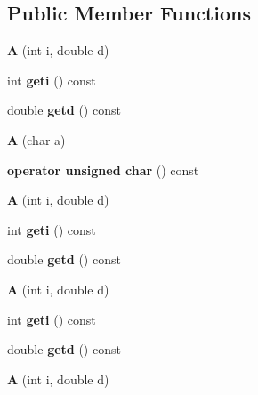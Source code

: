 \subsection*{Public Member Functions}
\begin{DoxyCompactItemize}
\item 
\mbox{\label{struct_a_af41bea0f740b099a40e80facb3f7833e}} 
{\bfseries A} (int i, double d)
\item 
\mbox{\label{struct_a_a706386ebda5915b4439251de29893702}} 
int {\bfseries geti} () const
\item 
\mbox{\label{struct_a_acf9e92fcfdc23959d39d12a16b65c86d}} 
double {\bfseries getd} () const
\item 
\mbox{\label{struct_a_a290368d869be7af793ef23182a35dde3}} 
{\bfseries A} (char a)
\item 
\mbox{\label{struct_a_ae1a38ae3dc26006940d981d468ee256b}} 
{\bfseries operator unsigned char} () const
\item 
\mbox{\label{struct_a_af41bea0f740b099a40e80facb3f7833e}} 
{\bfseries A} (int i, double d)
\item 
\mbox{\label{struct_a_a706386ebda5915b4439251de29893702}} 
int {\bfseries geti} () const
\item 
\mbox{\label{struct_a_acf9e92fcfdc23959d39d12a16b65c86d}} 
double {\bfseries getd} () const
\item 
\mbox{\label{struct_a_af41bea0f740b099a40e80facb3f7833e}} 
{\bfseries A} (int i, double d)
\item 
\mbox{\label{struct_a_a706386ebda5915b4439251de29893702}} 
int {\bfseries geti} () const
\item 
\mbox{\label{struct_a_acf9e92fcfdc23959d39d12a16b65c86d}} 
double {\bfseries getd} () const
\item 
\mbox{\label{struct_a_af41bea0f740b099a40e80facb3f7833e}} 
{\bfseries A} (int i, double d)
\item 

\end{DoxyCompactItemize}
